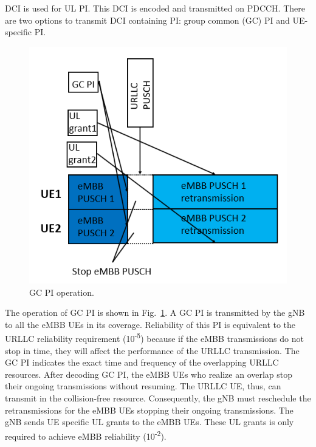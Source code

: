 \documentclass{ieeeaccess}
\begin{document}
DCI is used for UL PI. This DCI is encoded and transmitted on PDCCH. There are two options to transmit DCI containing PI: group common (GC) PI and UE-specific PI.

\begin{figure}[htbp]
\centerline{\includegraphics[scale=0.4]{fig10.PNG}}
\caption{GC PI operation.}
\label{fig10}
\end{figure}

The operation of GC PI is shown in Fig.~\ref{fig10}. A GC PI is transmitted by the gNB to all the eMBB UEs in its coverage. Reliability of this PI is equivalent to the URLLC reliability requirement (10\textsuperscript{-5}) because if the eMBB transmissions do not stop in time, they will affect the performance of the URLLC transmission. The GC PI indicates the exact time and frequency of the overlapping URLLC resources. After decoding GC PI, the eMBB UEs who realize an overlap stop their ongoing transmissions without resuming. The URLLC UE, thus, can transmit in the collision-free resource. Consequently, the gNB must reschedule the retransmissions for the eMBB UEs stopping their ongoing transmissions. The gNB sends UE specific UL grants to the eMBB UEs. These UL grants is only required to achieve eMBB reliability (10\textsuperscript{-2}).
\end{document}
